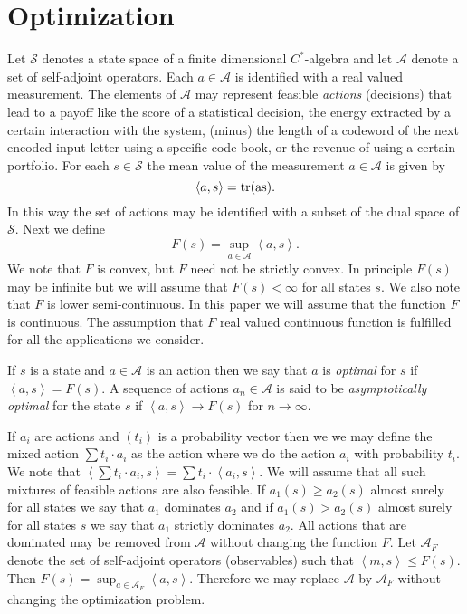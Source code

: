 \documentclass[10pt,a4paper,draft]{article}
\begin{document}
\section{Optimization}

Let $\mathcal{S}$ denotes a state space of a finite dimensional $C^*$-algebra and let $\mathcal{A}$ denote a set of self-adjoint operators. Each $a\in\mathcal{A}$ is identified with a real valued measurement. The elements of $\mathcal{A}$ may represent feasible \emph{actions} 
(decisions) that lead to a payoff like the score of a
statistical decision, the energy extracted by a certain interaction with the
system, (minus) the length of a codeword of the next encoded input
letter using a specific code book, or the revenue of using a certain
portfolio. For each $s\in\mathcal{S}$ the mean value of the measurement $a\in\mathcal{A}$ is given by 
\[
\left\langle a,s\right\rangle =\rm{tr}(as).
\]
In this way the set of actions may be identified with a subset of the dual space of $\mathcal{S}$. Next we define 
\[
F\left(s\right)=\sup_{a\in\mathcal{A}}\left\langle
a,s\right\rangle .
\]
 We note that $F$ is convex, but $F$ need not be strictly convex. In principle $F(s)$ may be infinite but we will assume that $F(s)<\infty$ for all states $s$. We also note that $F$ is lower semi-continuous. In this paper we will assume that the function $F$ is continuous. The assumption that $F$ real valued continuous function is fulfilled for all the applications we consider. 

If $s$ is a state and $a\in\mathcal{A}$ is an action then we say that $a$ is {\em optimal} for $s$ if $\left\langle
a,s\right\rangle = F\left(s\right)$. A sequence of actions $a_n\in\mathcal{A}$  is said to be {\em asymptotically optimal} for the state $s$ if  $\left\langle a,s\right\rangle \to F\left(s\right)$ for $n\to \infty.$

If $a_{i}$ are actions and $\left(t_{i}\right)$ is a probability
vector then we we may define the mixed action $\sum t_{i}\cdot a_{i}$
as the action where we do the action $a_{i}$ with probability $t_{i}.$ We note
that $\left\langle \sum t_{i}\cdot a_{i},s\right\rangle =\sum t_{i}\cdot\left\langle a_{i},s\right\rangle .$
We will assume that all such mixtures of feasible actions are also
feasible. If $a_{1}\left(s\right)\geq a_{2}\left(s\right)$ almost
surely for all states we say that $a_{1}$ dominates $a_{2}$ and
if $a_{1}\left(s\right)>a_{2}\left(s\right)$ almost surely for all
states $s$ we say that $a_{1}$ strictly dominates $a_{2}.$ All
actions that are dominated may be removed from $\mathcal{A}$ without
changing the function $F.$  Let $\mathcal{A}_{F}$ denote the set of self-adjoint operators (observables) such that $\left\langle m,s\right\rangle \leq F\left(s\right).$
Then $F\left(s\right)=\sup_{a\in\mathcal{A}_{F}}\left\langle a,s\right\rangle .$
Therefore we may replace $\mathcal{A}$ by $\mathcal{A}_{F}$ without
changing the optimization problem.
\end{document}
